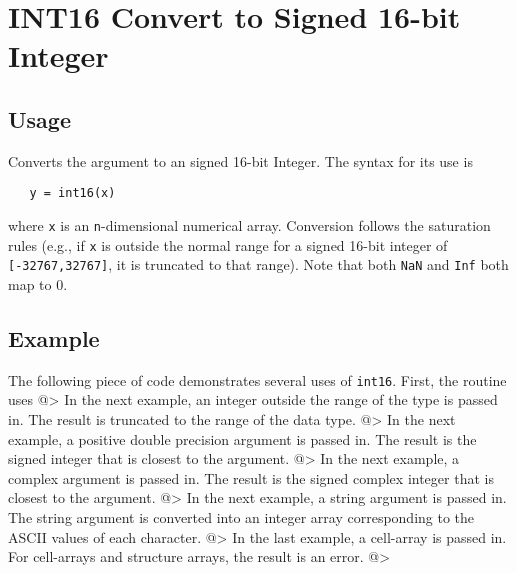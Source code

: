 \section{INT16 Convert to Signed 16-bit Integer}

\subsection{Usage}

Converts the argument to an signed 16-bit Integer.  The syntax
for its use is
\begin{verbatim}
   y = int16(x)
\end{verbatim}
where \verb|x| is an \verb|n|-dimensional numerical array.  Conversion
follows the saturation rules (e.g., if \verb|x| is outside the normal
range for a signed 16-bit integer of \verb|[-32767,32767]|, it is truncated
to that range).  Note that both \verb|NaN| and \verb|Inf| both map to 0.
\subsection{Example}

The following piece of code demonstrates several uses of \verb|int16|.  First, the routine uses
@>
In the next example, an integer outside the range  of the type is passed in.  
The result is truncated to the range of the data type.
@>
In the next example, a positive double precision argument is passed in.  
The result is the signed integer that is closest to the argument.
@>
In the next example, a complex argument is passed in.  The result is the 
signed complex integer that is closest to the argument.
@>
In the next example, a string argument is passed in.  The string argument is 
converted into an integer array corresponding to the ASCII values of each character.
@>
In the last example, a cell-array is passed in.  For cell-arrays and 
structure arrays, the result is an error.
@>
